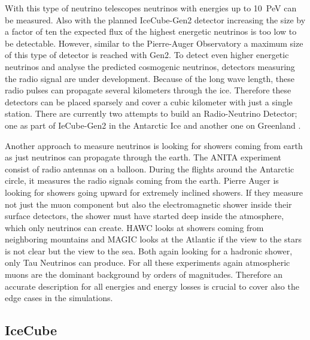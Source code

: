 With this type of neutrino telescopes neutrinos with energies up to \SI{10}{PeV} can be measured.
Also with the planned IceCube-Gen2 detector increasing the size by a factor of ten \cite{IceCube20Gen2} the expected flux of the highest energetic neutrinos is too low to be detectable.
However, similar to the Pierre-Auger Observatory a maximum size of this type of detector is reached with Gen2.
To detect even higher energetic neutrinos and analyse the predicted cosmogenic neutrinos, detectors measuring the radio signal are under development.
Because of the long wave length, these radio pulses can propagate several kilometers through the ice.
Therefore these detectors can be placed sparsely and cover a cubic kilometer with just a single station.
There are currently two attempts to build an Radio-Neutrino Detector; one as part of IeCube-Gen2 in the Antarctic Ice and another one on Greenland \cite{RNOG20}.

Another approach to measure neutrinos is looking for showers coming from earth as just neutrinos can propagate through the earth.
The ANITA experiment consist of radio antennas on a balloon.
During the flights around the Antarctic circle, it measures the radio signals coming from the earth.
Pierre Auger is looking for showers going upward for extremely inclined showers.
If they measure not just the muon component but also the electromagnetic shower inside their surface detectors, the shower must have started deep inside the atmosphere, which only neutrinos can create.
HAWC looks at showers coming from neighboring mountains and MAGIC looks at the Atlantic if the view to the stars is not clear but the view to the sea.
Both again looking for a hadronic shower, only Tau Neutrinos can produce.
For all these experiments again atmospheric muons are the dominant background by orders of magnitudes.
Therefore an accurate description for all energies and energy losses is crucial to cover also the edge cases in the simulations.

\subsection{IceCube} \label{sec:IceCube}

